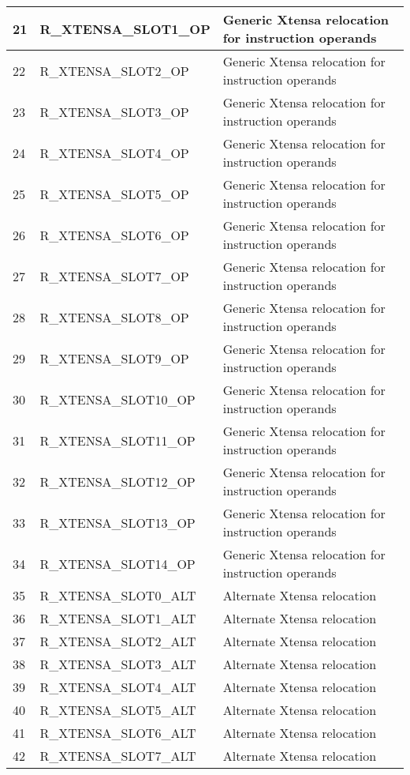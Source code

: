 \begin{longtable}{|p{1cm}|p{6cm}|p{10cm}|}
	21 & R\_XTENSA\_SLOT1\_OP & Generic Xtensa relocation for instruction operands\\ \hline
	22 & R\_XTENSA\_SLOT2\_OP & Generic Xtensa relocation for instruction operands\\ \hline
	23 & R\_XTENSA\_SLOT3\_OP & Generic Xtensa relocation for instruction operands\\ \hline
	24 & R\_XTENSA\_SLOT4\_OP & Generic Xtensa relocation for instruction operands\\ \hline
	25 & R\_XTENSA\_SLOT5\_OP & Generic Xtensa relocation for instruction operands\\ \hline
	26 & R\_XTENSA\_SLOT6\_OP & Generic Xtensa relocation for instruction operands\\ \hline
	27 & R\_XTENSA\_SLOT7\_OP & Generic Xtensa relocation for instruction operands\\ \hline
	28 & R\_XTENSA\_SLOT8\_OP & Generic Xtensa relocation for instruction operands\\ \hline
	29 & R\_XTENSA\_SLOT9\_OP & Generic Xtensa relocation for instruction operands\\ \hline
	30 & R\_XTENSA\_SLOT10\_OP & Generic Xtensa relocation for instruction operands\\ \hline
	31 & R\_XTENSA\_SLOT11\_OP & Generic Xtensa relocation for instruction operands\\ \hline
	32 & R\_XTENSA\_SLOT12\_OP & Generic Xtensa relocation for instruction operands\\ \hline
	33 & R\_XTENSA\_SLOT13\_OP & Generic Xtensa relocation for instruction operands\\ \hline
	34 & R\_XTENSA\_SLOT14\_OP & Generic Xtensa relocation for instruction operands\\ \hline
	35 & R\_XTENSA\_SLOT0\_ALT & Alternate Xtensa relocation \\ \hline
	36 & R\_XTENSA\_SLOT1\_ALT & Alternate Xtensa relocation \\ \hline
	37 & R\_XTENSA\_SLOT2\_ALT & Alternate Xtensa relocation \\ \hline
	38 & R\_XTENSA\_SLOT3\_ALT & Alternate Xtensa relocation \\ \hline
	39 & R\_XTENSA\_SLOT4\_ALT & Alternate Xtensa relocation \\ \hline
	40 & R\_XTENSA\_SLOT5\_ALT & Alternate Xtensa relocation \\ \hline
	41 & R\_XTENSA\_SLOT6\_ALT & Alternate Xtensa relocation \\ \hline
	42 & R\_XTENSA\_SLOT7\_ALT & Alternate Xtensa relocation \\ \hline

\end{longtable}
